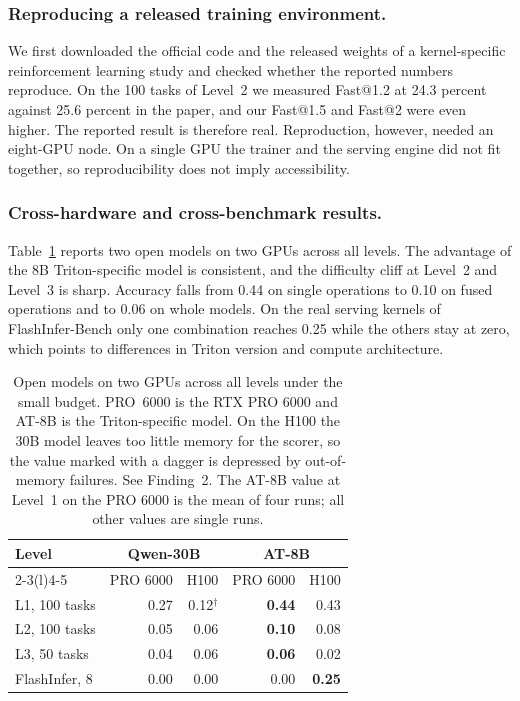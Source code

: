 \documentclass[11pt]{article}
\newcommand{\headrow}[1]{\textbf{#1}}
\begin{document}
\subsubsection{Reproducing a released training environment.}
We first downloaded the official code and the released weights of a kernel-specific reinforcement
learning study and checked whether the reported numbers reproduce. On the 100 tasks of Level~2 we
measured Fast@1.2 at 24.3 percent against 25.6 percent in the paper, and our Fast@1.5 and Fast@2
were even higher. The reported result is therefore real. Reproduction, however, needed an
eight-GPU node. On a single GPU the trainer and the serving engine did not fit together, so
reproducibility does not imply accessibility.

\subsubsection{Cross-hardware and cross-benchmark results.}
Table~\ref{tab:rq5} reports two open models on two GPUs across all levels. The advantage of the
8B Triton-specific model is consistent, and the difficulty cliff at Level~2 and Level~3 is sharp.
Accuracy falls from 0.44 on single operations to 0.10 on fused operations and to 0.06 on whole
models. On the real serving kernels of FlashInfer-Bench only one combination reaches 0.25 while
the others stay at zero, which points to differences in Triton version and compute architecture.

\begin{table}[t]
\centering
\small
\setlength{\tabcolsep}{4pt}
\caption{Open models on two GPUs across all levels under the small budget. PRO~6000 is the RTX PRO
6000 and AT-8B is the Triton-specific model. On the H100 the 30B model leaves too little memory for
the scorer, so the value marked with a dagger is depressed by out-of-memory failures. See Finding~2.
The AT-8B value at Level~1 on the PRO 6000 is the mean of four runs; all other values are single runs.}
\label{tab:rq5}
\begin{tabular}{@{}lrrrr@{}}
\toprule
\multirow{2}{*}{\headrow{Level}} & \multicolumn{2}{c}{\headrow{Qwen-30B}} & \multicolumn{2}{c}{\headrow{AT-8B}} \\
\cmidrule(lr){2-3}\cmidrule(l){4-5}
 & PRO 6000 & H100 & PRO 6000 & H100 \\
\midrule
L1, 100 tasks    & 0.27 & 0.12$^{\dagger}$ & \textbf{0.44} & 0.43 \\
L2, 100 tasks    & 0.05 & 0.06 & \textbf{0.10} & 0.08 \\
L3, 50 tasks     & 0.04 & 0.06 & \textbf{0.06} & 0.02 \\
FlashInfer, 8    & 0.00 & 0.00 & 0.00 & \textbf{0.25} \\
\bottomrule
\end{tabular}
\end{table}
\end{document}
